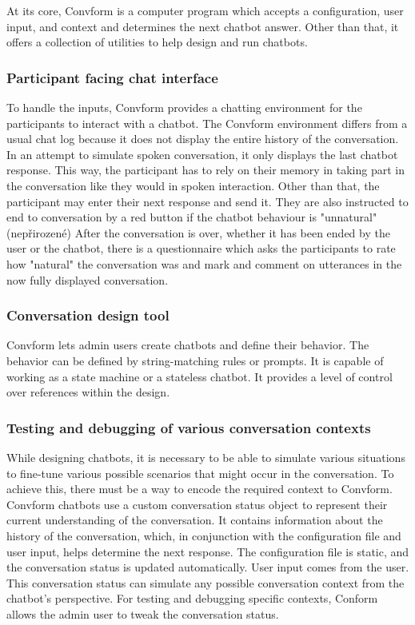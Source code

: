 \documentclass[12pt]{report}
\begin{document}
{At its core, Convform is a computer program
which accepts a configuration, user input, and context
and determines the next chatbot answer.
Other than that, it offers a collection of utilities
to help design and run chatbots.

\subsubsection{Participant facing chat interface}
To handle the inputs, Convform provides a chatting environment
for the participants to interact with a chatbot.
The Convform environment differs from a usual chat log
because it does not display
the entire history of the conversation.
In an attempt to simulate spoken conversation,
it only displays the last chatbot response.
This way, the participant has to rely on their memory
in taking part in the conversation
like they would in spoken interaction.
Other than that, the participant may enter their next response
and send it.
They are also instructed to end to conversation by a red button
if the chatbot behaviour is "unnatural" (nepřirozené)
After the conversation is over, whether it has been ended by the user or the chatbot,
there is a questionnaire which
asks the participants to rate how "natural" the conversation was
and mark and comment on utterances in the now fully displayed conversation.

\subsubsection{Conversation design tool}
Convform lets admin users create chatbots and define their behavior.
The behavior can be defined by string-matching rules or prompts.
It is capable of working as a state machine or a stateless chatbot.
It provides a level of control over references within the design.

\subsubsection{Testing and debugging of various conversation contexts}
While designing chatbots, it is necessary
to be able to simulate various situations
to fine-tune various possible scenarios
that might occur in the conversation.
To achieve this, there must be a way
to encode the required context to Convform.
Convform chatbots use a custom conversation status object
to represent their current understanding of the conversation.
It contains information about the history of the conversation, which, in conjunction with the configuration file and user input,
helps determine the next response.
The configuration file is static, and
the conversation status is updated automatically.
User input comes from the user.
This conversation status can simulate any possible conversation context
from the chatbot's perspective.
For testing and debugging specific contexts, Conform allows the admin user
to tweak the conversation status.

}
\end{document}
